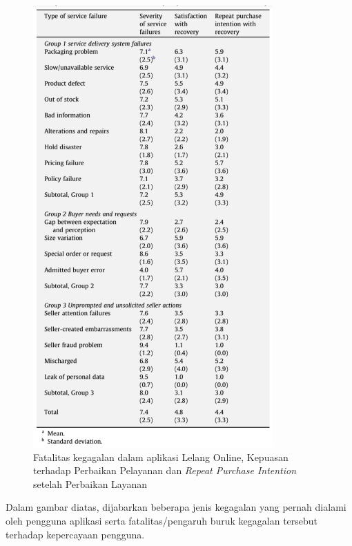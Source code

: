 	  \begin{figure}[H]
        \centering
        \includegraphics[height=.5\textheight]{images/bab3/Fatalitas-Kegagalan-Ecommerce.png}
        \caption{Fatalitas kegagalan dalam aplikasi Lelang Online, Kepuasan terhadap Perbaikan Pelayanan dan \textit{Repeat Purchase Intention} setelah Perbaikan Layanan}
        \label{severity-failures}
      \end{figure}
      
      Dalam gambar diatas, dijabarkan beberapa jenis kegagalan yang pernah dialami oleh pengguna aplikasi serta fatalitas/pengaruh buruk kegagalan tersebut terhadap kepercayaan pengguna. 
      
